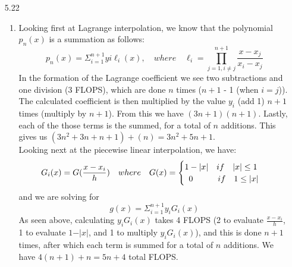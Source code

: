 \documentclass[11pt,a4paper]{article}
\begin{document}
\begin{itemize}
			\item[5.22]
				\begin{enumerate} [label={\alph*)}]
					\item Looking first at Lagrange interpolation, we know that the polynomial $p_n(x)$ is a summation as follows:
					$$p_n(x) = \Sigma_{i=1}^{n+1} yi\ell_i(x), \quad where \quad \ell_i= \prod_{j=1,i \neq j}^{n+1} \frac{x-x_j}{x_i - x_j}$$
					In the formation of the Lagrange coefficient we see two subtractions and one division (3 FLOPS), which are done $n$ times ($n+1$ - 1 (when $i=j$)). The calculated coefficient is then multiplied by the value $y_i$ (add 1) $n+1$ times (multiply by $n+1$). From this we have $(3n+1)(n+1)$. Lastly, each of the those terms is the summed, for a total of $n$ additions. This gives us $(3n^2+3n+n+1)+(n) = 3n^2+5n+1$. \\
					
					Looking next at the piecewise linear interpolation, we have:
					$$G_i(x) = G(\frac{x-x_i}{h}) \quad where \quad G(x) = \begin{cases}
					1-\vert x \vert \quad if \quad \vert x \vert \leq 1 \\
					\mkern9mu 0 \quad \quad \quad if \quad 1 \leq \vert x \vert
					\end{cases}$$
					and we are solving for
					$$g(x) = \Sigma_{i=1}^{n+1} y_iG_i(x) $$
					As seen above, calculating $y_iG_i(x)$ takes 4 FLOPS (2 to evaluate $\frac{x-x_i}{h}$, 1 to evaluate $1-\vert x \vert$, and 1 to multiply $y_iG_i(x)$), and this is done $n+1$ times, after which each term is summed for a total of $n$ additions. We have $4(n+1)+n = 5n+4$ total FLOPS. \\
					

\end{enumerate}
\end{itemize}
\end{document}
